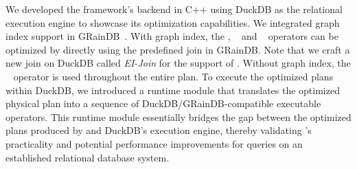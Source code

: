 We developed the \name framework's backend in C++ using DuckDB as the relational execution engine to showcase its optimization capabilities.
We integrated graph index support in GRainDB~\cite{graindb}. %
With graph index, the \expand, \expandedge~ and \getvertex~ operators can be optimized by directly using the predefined join in GRainDB.
Note that we craft a new join on DuckDB called \emph{EI-Join} for the support of \expandintersect.
Without graph index, the \hashjoin~ operator is used throughout the entire plan.
To execute the optimized plans within DuckDB, we introduced a runtime module that translates the optimized physical plan into a sequence of DuckDB/GRainDB-compatible executable operators.
This runtime module essentially bridges the gap between the optimized plans produced by \name and DuckDB's execution engine, thereby validating \name's practicality and potential performance improvements for \spjm queries on an established relational database system.




